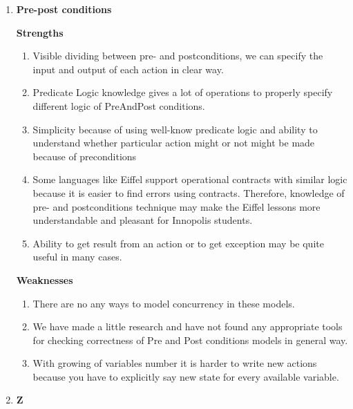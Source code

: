 \documentclass{article}
\begin{document}
\begin{enumerate}
\item \textbf{Pre-post conditions}

\textbf{Strengths}

\begin{enumerate}
\item Visible dividing between pre- and postconditions, we can specify the input and output of each action in clear way.
\item Predicate Logic knowledge gives a lot of operations to properly specify different logic of PreAndPost conditions.
\item Simplicity because of using well-know predicate logic and ability to understand whether particular action might or not might be made because of preconditions
\item Some languages like Eiffel support operational contracts with similar logic because it is easier to find errors using contracts. Therefore, knowledge of pre- and postconditions technique may make the Eiffel lessons more understandable and pleasant for Innopolis students.
\item Ability to get result from an action or to get exception may be quite useful in many cases.
\end{enumerate}


\textbf{Weaknesses}

\begin{enumerate}
\item There are no any ways to model concurrency in these models. 
\item We have made a little research and have not found any appropriate tools for checking correctness of Pre and Post conditions models in general way.
\item With growing of variables number it is harder to write new actions because you have to explicitly say new state for every available variable.
\end{enumerate}
\item \textbf{Z}


\end{enumerate}
\end{document}

